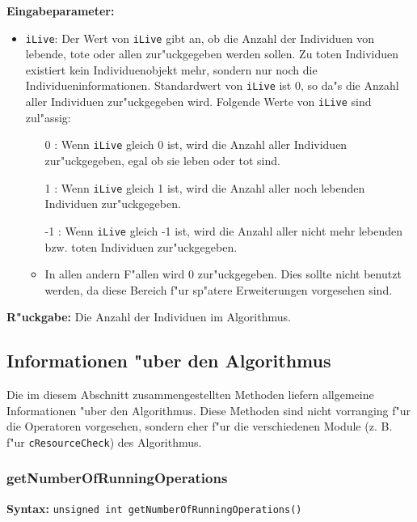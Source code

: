 \bigskip\noindent
\textbf{Eingabeparameter:}
\begin{itemize}
 \item \verb|iLive|: Der Wert von \verb|iLive| gibt an, ob die Anzahl der Individuen von lebende, tote oder allen zur"uckgegeben werden sollen. Zu toten Individuen existiert kein Individuenobjekt mehr, sondern nur noch die Individueninformationen. Standardwert von \verb|iLive| ist 0, so da"s die Anzahl aller Individuen zur"uckgegeben wird. Folgende Werte von \verb|iLive| sind zul"assig:
 \begin{itemize}
  \item [0]: Wenn \verb|iLive| gleich 0 ist, wird die Anzahl aller Individuen zur"uckgegeben, egal ob sie leben oder tot sind.
  \item [1]: Wenn \verb|iLive| gleich 1 ist, wird die Anzahl aller noch lebenden Individuen zur"uckgegeben.
  \item [-1]: Wenn \verb|iLive| gleich -1 ist, wird die Anzahl  aller nicht mehr lebenden bzw. toten Individuen zur"uckgegeben.
  \item In allen andern F"allen wird $0$ zur"uckgegeben. Dies sollte nicht benutzt werden, da diese Bereich f"ur sp"atere Erweiterungen vorgesehen sind.
 \end{itemize}
\end{itemize}

\bigskip\noindent
\textbf{R"uckgabe:} Die Anzahl der Individuen im Algorithmus.



\subsection{Informationen "uber den Algorithmus}

Die im diesem Abschnitt zusammengestellten Methoden liefern allgemeine Informationen "uber den Algorithmus. Diese Methoden sind nicht vorranging f"ur die Operatoren vorgesehen, sondern eher f"ur die verschiedenen Module (z. B. f"ur \verb|cResourceCheck|) des Algorithmus.

\subsubsection{getNumberOfRunningOperations}

\textbf{Syntax:} \verb|unsigned int getNumberOfRunningOperations()| \\

